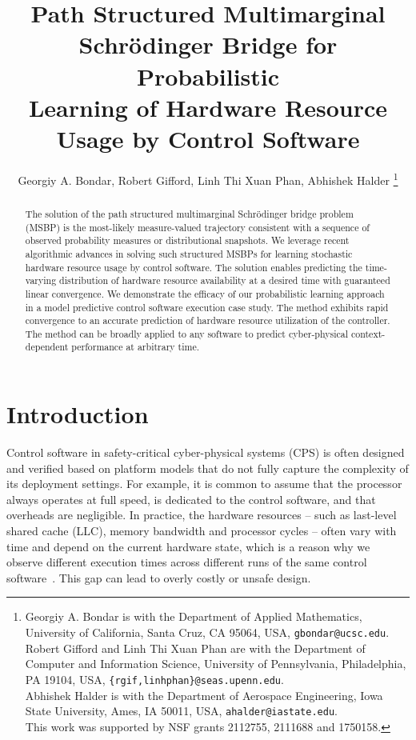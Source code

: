 \documentclass[letterpaper, 10pt, twocolumn]{ieeeconf}      %
\title{\LARGE\textbf{
Path Structured Multimarginal Schr\"{o}dinger Bridge for Probabilistic\\Learning of Hardware Resource Usage by Control Software}
}
\author{Georgiy A. Bondar, Robert Gifford, Linh Thi Xuan Phan, Abhishek Halder%
\thanks{Georgiy A. Bondar is with the Department of Applied Mathematics, University of California, Santa Cruz, CA 95064, USA,
       {\tt\small{gbondar@ucsc.edu}}.\\
       Robert Gifford and Linh Thi Xuan Phan are with the Department of Computer and Information Science, University of Pennsylvania, Philadelphia, PA 19104, USA,
        {\tt\small{\{rgif,linhphan\}@seas.upenn.edu}}.\\
        Abhishek Halder is with the Department of Aerospace Engineering, Iowa State University, Ames, IA 50011, USA,
        {\tt\small{ahalder@iastate.edu}}.\\
        This work was supported by NSF grants 2112755, 2111688 and  1750158.
}}
\begin{document}
\maketitle


\begin{abstract}
The solution of the path structured multimarginal Schr\"{o}dinger bridge problem (MSBP) is the most-likely measure-valued trajectory consistent with a sequence of observed probability measures or distributional snapshots. We leverage recent algorithmic advances in solving such structured MSBPs for learning stochastic hardware resource usage by control software. The solution enables predicting the time-varying distribution of hardware resource availability at a desired time with guaranteed linear convergence. We demonstrate the efficacy of our probabilistic learning approach in a model predictive control software execution case study. The method exhibits rapid convergence to an accurate prediction of hardware resource utilization of the controller. The method can be broadly applied to any software to predict cyber-physical context-dependent performance at arbitrary time. 
\end{abstract}

\section{Introduction}\label{sec:introduction}

\noindent Control software in safety-critical cyber-physical systems (CPS) is often designed and verified based on platform models that do not fully capture the complexity of its deployment settings. For example, it is common to assume that the processor always operates at full speed, is dedicated to the control software, and that overheads are negligible. In practice, the hardware resources -- such as last-level shared cache (LLC), memory bandwidth and processor cycles -- often vary with time and depend on the current hardware state, which is a reason why we observe different execution times across different runs of the same control software~\cite{Bernat2002}. This gap can lead to overly costly or unsafe design.
\end{document}

